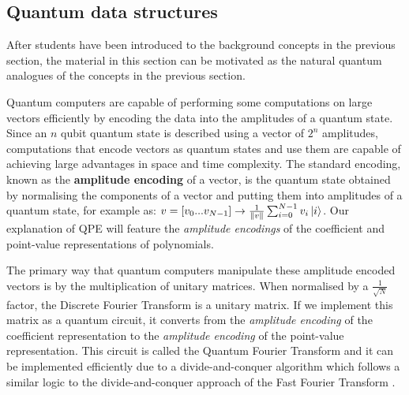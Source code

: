 \documentclass[prb,preprint]{revtex4}
\begin{document}
	
	
	\subsection{Quantum data structures}
	
	After students have been introduced to the background concepts in the previous section, the material in this section can be motivated as the natural quantum analogues of the concepts in the previous section. 
	
	Quantum computers are capable of performing some computations on large vectors efficiently by encoding the data into the amplitudes of a quantum state. Since an $n$ qubit quantum state is described using a vector of $2^n$ amplitudes, computations that encode vectors as quantum states and use them are capable of achieving large advantages in space and time complexity. The standard encoding, known as the \textbf{amplitude encoding} of a vector, is the quantum state obtained by normalising the components of a vector and putting them into amplitudes of a quantum state, for example as: $v= [v_0 ... v_{N-1}] \rightarrow \frac{1}{\norm{v}} \sum_{i=0}^{N-1} v_i \ket{i}$. Our explanation of QPE will feature the \textit{amplitude encodings} of the coefficient and point-value representations of polynomials.%
	
	The primary way that quantum computers manipulate these amplitude encoded vectors is by the multiplication of unitary matrices. 
	When normalised by a $\frac{1}{\sqrt{N}}$ factor, the Discrete Fourier Transform is a unitary matrix. If we implement this matrix as a quantum circuit, it converts from the \textit{amplitude encoding} of the coefficient representation to the \textit{amplitude encoding} of the point-value representation. This circuit is called the Quantum Fourier Transform and it can be implemented efficiently due to a divide-and-conquer algorithm which follows a similar logic to the divide-and-conquer approach of the Fast Fourier Transform \cite{paradisi2004presentation}.
\end{document}
